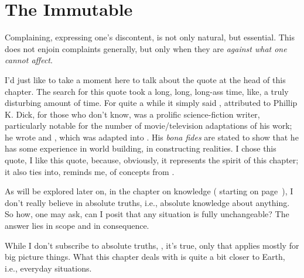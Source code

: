 \documentclass[../butidigress.tex]{subfiles}
\begin{document}
\chapter{The Immutable}\label{chap:immutable}
\newpage

Complaining, expressing one's discontent, is not only natural, but essential.
This does not enjoin complaints generally, but only when they are \emph{against what one cannot affect}.

I'd just like to take a moment here to talk about the quote at the head of this chapter.
The search for this quote took a long, long, long-ass time, like, a truly disturbing amount of time.
For quite a while it simply said , attributed to 
Phillip K. Dick, for those who don't know, was a prolific science-fiction writer, particularly notable for the number of movie/television adaptations of his work; he wrote  and , which was adapted into .
His \textit{bona fides} are stated to show that he has some experience in world building, in constructing realities.
I chose this quote, I like this quote, because, obviously, it represents the spirit of this chapter; it also ties into, reminds me, of concepts from .

As will be explored later on, in the chapter on knowledge ( starting on page~\pageref{chap:knowledge}), I don't really believe in absolute truths, i.e., absolute knowledge about anything.
So how, one may ask, can I posit that any situation is fully unchangeable?
The answer lies in scope and in consequence.

While I don't subscribe to absolute truths, , it's true, only  that applies mostly for big picture things.
What this chapter deals with is quite a bit closer to Earth, i.e., everyday situations.
\end{document}
